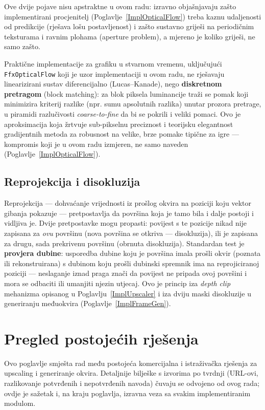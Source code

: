 \documentclass{mathos}
\begin{document}
Ove dvije pojave nisu apstraktne u ovom radu: izravno objašnjavaju zašto
implementirani procjenitelj (Poglavlje~\ref{ImplOpticalFlow}) treba kaznu
udaljenosti od predikcije (rješava lošu postavljenost) i zašto sustavno
griješi na periodičnim teksturama i ravnim plohama (aperture problem), a
mjereno je koliko griješi, ne samo zašto.

Praktične implementacije za grafiku u stvarnom vremenu, uključujući
\verb+FfxOpticalFlow+ koji je uzor implementaciji u ovom radu, ne rješavaju
linearizirani sustav diferencijalno (Lucas--Kanade), nego \textbf{diskretnom
pretragom} (block matching): za blok piksela luminancije traži se pomak koji
minimizira kriterij razlike (npr. sumu apsolutnih razlika) unutar prozora
pretrage, u piramidi razlučivosti \emph{coarse-to-fine} da bi se pokrili i
veliki pomaci. Ovo je aproksimacija koja žrtvuje sub-pikselnu preciznost i
teorijsku elegantnost gradijentnih metoda za robusnost na velike, brze
pomake tipične za igre — kompromis koji je u ovom radu izmjeren, ne samo
naveden (Poglavlje~\ref{ImplOpticalFlow}).

\section{Reprojekcija i disokluzija}

Reprojekcija — dohvaćanje vrijednosti iz prošlog okvira na poziciji koju
vektor gibanja pokazuje — pretpostavlja da površina koja je tamo bila i dalje
postoji i vidljiva je. Dvije pretpostavke mogu propasti: povijest s te
pozicije nikad nije zapisana za \emph{ovu} površinu (nova površina se otkriva
— disokluzija), ili je zapisana za drugu, sada prekrivenu površinu (obrnuta
disokluzija). Standardan test je \textbf{provjera dubine}: usporedba dubine
koju je površina imala prošli okvir (poznata ili rekonstruirana) s dubinom
koju prošli dubinski spremnik ima na reprojiciranoj poziciji — neslaganje
iznad praga znači da povijest ne pripada ovoj površini i mora se odbaciti ili
umanjiti njezin utjecaj. Ovo je princip iza \emph{depth clip} mehanizma
opisanog u Poglavlju~\ref{ImplUpscaler} i iza dviju maski disokluzije u
generiranju međuokvira (Poglavlje~\ref{ImplFrameGen}).


\chapter{Pregled postojećih rješenja}\label{PregledRjesenja}

Ovo poglavlje smješta rad među postojeća komercijalna i istraživačka
rješenja za upscaling i generiranje okvira. Detaljnije bilješke s izvorima po
tvrdnji (URL-ovi, razlikovanje potvrđenih i nepotvrđenih navoda) čuvaju se
odvojeno od ovog rada; ovdje je sažetak i, na kraju poglavlja, izravna veza
sa svakim implementiranim modulom.
\end{document}

